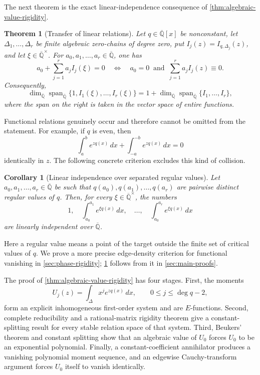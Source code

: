 \documentclass[11pt]{article}
\numberwithin{equation}{section}
\newtheorem{theorem}{Theorem}[section]
\newtheorem{corollary}[corollary]{Corollary}
\theoremstyle{definition}
\theoremstyle{remark}
\newcommand{\Qbar}{\overline{\mathbb Q}}
\newcommand{\Span}{\operatorname{span}}
\begin{document}
The next theorem is the exact linear-independence consequence of
\cref{thm:algebraic-value-rigidity}.

\begin{theorem}[Transfer of linear relations]\label{thm:relation-transfer}
Let $q\in\Qbar[x]$ be nonconstant, let
$\Delta_1,\ldots,\Delta_r$ be finite algebraic zero-chains of degree zero, put
$I_j(z)=I_{q,\Delta_j}(z)$, and let $\xi\in\Qbar^\times$.  For
$a_0,a_1,\ldots,a_r\in\Qbar$, one has
\begin{equation}\label{eq:relation-transfer}
  a_0+\sum_{j=1}^r a_jI_j(\xi)=0
  \quad\Longleftrightarrow\quad
  a_0=0\ \text{ and }\
  \sum_{j=1}^r a_jI_j(z)\equiv0.
\end{equation}
Consequently,
\begin{equation}\label{eq:dimension-transfer}
  \dim_{\Qbar}\Span_{\Qbar}\{1,I_1(\xi),\ldots,I_r(\xi)\}
  =1+\dim_{\Qbar}\Span_{\Qbar}\{I_1,\ldots,I_r\},
\end{equation}
where the span on the right is taken in the vector space of entire functions.
\end{theorem}

Functional relations genuinely occur and therefore cannot be omitted from the
statement.  For example, if $q$ is even, then
\[
  \int_a^b e^{zq(x)}\,dx
  +\int_{-a}^{-b}e^{zq(x)}\,dx=0
\]
identically in $z$.  The following concrete criterion excludes this kind of
collision.

\begin{corollary}[Linear independence over separated regular values]
\label{cor:regular-value-independence}
Let $a_0,a_1,\ldots,a_r\in\Qbar$ be such that
$q(a_0),q(a_1),\ldots,q(a_r)$ are pairwise distinct regular values of $q$.
Then, for every $\xi\in\Qbar^\times$, the numbers
\begin{equation}\label{eq:regular-value-family}
  1,\quad
  \int_{a_0}^{a_1}e^{\xi q(x)}\,dx,\quad\ldots,\quad
  \int_{a_0}^{a_r}e^{\xi q(x)}\,dx
\end{equation}
are linearly independent over $\Qbar$.
\end{corollary}

Here a regular value means a point of the target outside the finite set of
critical values of $q$.  We prove a more precise edge-density criterion for
functional vanishing in \cref{sec:phase-rigidity};
\cref{cor:regular-value-independence} follows from it in
\cref{sec:main-proofs}.

The proof of \cref{thm:algebraic-value-rigidity} has four stages.  First, the
moments
\[
  U_j(z)=\int_\Delta x^j e^{zq(x)}\,dx,
  \qquad 0\le j\le\deg q-2,
\]
form an explicit inhomogeneous first-order system and are $E$-functions.
Second, complete reducibility and a rational-matrix rigidity theorem give a
constant-splitting result for every stable relation space of that system.
Third, Beukers' theorem and constant splitting show that an algebraic value of
$U_0$ forces $U_0$ to be an exponential polynomial.  Finally, a
constant-coefficient annihilator produces a vanishing polynomial moment
sequence, and an edgewise Cauchy-transform argument forces $U_0$ itself to
vanish identically.
\end{document}
